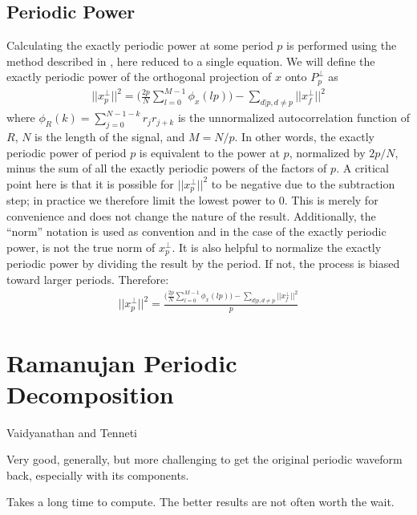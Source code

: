     \subsection{Periodic Power}
    Calculating the exactly periodic power at some period $p$ is performed using the method described in \cite{muresan2003orthogonal}, here reduced to a single equation. We will define the exactly periodic power of the orthogonal projection of $x$ onto $P_{p}^{\perp}$ as
    \begin{align}
        ||x_{p}^{\perp}||^2 = \Bigg( \frac{2p}{N} \sum_{l=0}^{M-1} \phi_{x}(lp) \Bigg) - \sum_{d|p, d \neq p} ||x_{f}^{\perp}||^2
    \end{align}
    where $\phi_R(k) = \sum_{j=0}^{N-1-k} r_{j} r_{j+k}$ is the unnormalized autocorrelation function of $R$, $N$ is the length of the signal, and $M = N/p$. In other words, the exactly periodic power of period $p$ is equivalent to the power at $p$, normalized by $2p/N$, minus the sum of all the exactly periodic powers of the factors of $p$. A critical point here is that it is possible for $||x_{p}^{\perp}||^2$ to be negative due to the subtraction step; in practice we therefore limit the lowest power to 0. This is merely for convenience and does not change the nature of the result. Additionally, the ``norm'' notation is used as convention and in the case of the exactly periodic power, is not the true norm of $x_{p}^{\perp}$. It is also helpful to normalize the exactly periodic power by dividing the result by the period. If not, the process is biased toward larger periods. Therefore:
    \begin{align}\label{eq:intro:exactlyPeriodicPower}
        ||x_{p}^{\perp}||^2 = \frac{\Bigg( \frac{2p}{N} \sum_{l=0}^{M-1} \phi_{x}(lp) \Bigg) - \sum_{d|p, d \neq p} ||x_{f}^{\perp}||^2} {p}
    \end{align}


\section{Ramanujan Periodic Decomposition}

Vaidyanathan and Tenneti

Very good, generally, but more challenging to get the original periodic waveform back, especially with its components.

Takes a long time to compute. The better results are not often worth the wait.
